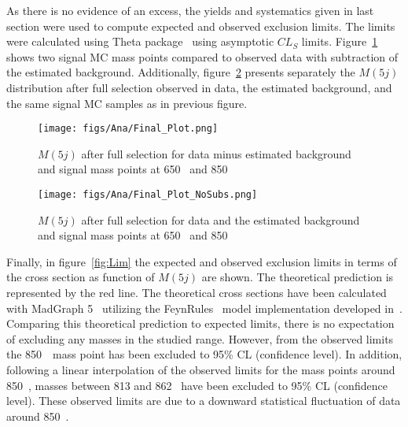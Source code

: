 As there is no evidence of an excess, the yields and systematics given in last section were used to compute expected and observed exclusion limits. The limits were calculated using Theta package~\cite{theta_web} using asymptotic $CL_{S}$ limits. Figure~\ref{fig:FinalPlot} shows two signal MC mass points compared to observed data with subtraction of the estimated background. Additionally, figure~\ref{fig:FinalPlot2} presents separately the $M(5j)$ distribution after full selection observed in data, the estimated background, and the same signal MC samples as in previous figure.

\begin{figure}[!Hhtbp]
  \begin{center}
    \texttt{[image: figs/Ana/Final\_Plot.png]}
    \caption{$M(5j)$ after full selection for data minus estimated background and signal mass points at 650 \GeVcc~and 850 \GeVcc}
    \label{fig:FinalPlot}
  \end{center}
\end{figure}

\begin{figure}[!Hhtbp]
  \begin{center}
    \texttt{[image: figs/Ana/Final\_Plot\_NoSubs.png]}
    \caption{$M(5j)$ after full selection for data and the estimated background and signal mass points at 650 \GeVcc~and 850 \GeVcc}
    \label{fig:FinalPlot2}
  \end{center}
\end{figure}

Finally, in figure~\ref{fig:Lim} the expected and observed exclusion limits in terms of the cross section as function of $M(5j)$ are shown. The theoretical prediction is represented by the red line. The theoretical cross sections have been calculated with MadGraph 5~\cite{Alwall:2014hca, Alwall:2011uj} utilizing the FeynRules~\cite{Alloul:2013bka} model implementation developed in~\cite{Buchkremer:2013bha, Cacciapaglia:2011fx}. Comparing this theoretical prediction to expected limits, there is no expectation of excluding any masses in the studied range. However, from the observed limits the 850~\GeVcc~mass point has been excluded to 95\% CL (confidence level). In addition, following a linear interpolation of the observed limits for the mass points around 850~\GeVcc, masses between 813 and 862 \GeVcc~have been excluded to 95\% CL (confidence level). These observed limits are due to a downward statistical fluctuation of data around 850~\GeVcc. 


